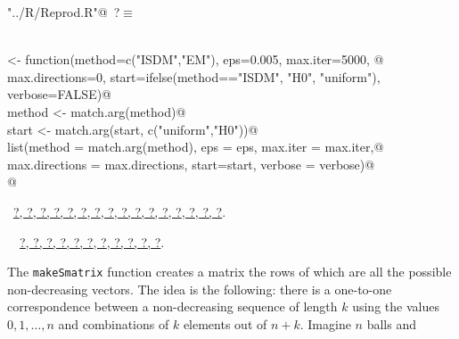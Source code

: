 \documentclass[reqno]{amsart}
\renewcommand{\NWtarget}[2]{\hypertarget{#1}{#2}}
\renewcommand{\NWlink}[2]{\hyperlink{#1}{#2}}
\begin{document}
\begin{flushleft} \small\label{scrap11}\raggedright\small
\NWtarget{nuweb?}{} \verb@"../R/Reprod.R"@\nobreak\ {\footnotesize {?}}$\equiv$
\vspace{-1ex}
\begin{list}{}{} \item
\mbox{}\verb@@\\
\mbox{}\verb@soControl <- function(method=c("ISDM","EM"), eps=0.005, max.iter=5000, @\\
\mbox{}\verb@      max.directions=0, start=ifelse(method=="ISDM", "H0", "uniform"), verbose=FALSE){@\\
\mbox{}\verb@  method <- match.arg(method)@\\
\mbox{}\verb@  start <- match.arg(start, c("uniform","H0"))@\\
\mbox{}\verb@  list(method = match.arg(method), eps = eps, max.iter = max.iter,@\\
\mbox{}\verb@       max.directions = max.directions, start=start, verbose = verbose)@\\
\mbox{}\verb@}@\\
\mbox{}\verb@@{\NWsep}
\end{list}
\vspace{-1.5ex}
\footnotesize
\begin{list}{}{\setlength{\itemsep}{-\parsep}\setlength{\itemindent}{-\leftmargin}}
\item \NWtxtFileDefBy\ \NWlink{nuweb?}{?}\NWlink{nuweb?}{, ?}\NWlink{nuweb?}{, ?}\NWlink{nuweb?}{, ?}\NWlink{nuweb?}{, ?}\NWlink{nuweb?}{, ?}\NWlink{nuweb?}{, ?}\NWlink{nuweb?}{, ?}\NWlink{nuweb?}{, ?}\NWlink{nuweb?}{, ?}\NWlink{nuweb?}{, ?}\NWlink{nuweb?}{, ?}\NWlink{nuweb?}{, ?}\NWlink{nuweb?}{, ?}\NWlink{nuweb?}{, ?}\NWlink{nuweb?}{, ?}.
\item \NWtxtIdentsDefed\nobreak\  \verb@soControl@\nobreak\ \NWlink{nuweb?}{?}\NWlink{nuweb?}{, ?}\NWlink{nuweb?}{, ?}\NWlink{nuweb?}{, ?}\NWlink{nuweb?}{, ?}\NWlink{nuweb?}{, ?}\NWlink{nuweb?}{, ?}\NWlink{nuweb?}{, ?}\NWlink{nuweb?}{, ?}\NWlink{nuweb?}{, ?}\NWlink{nuweb?}{, ?}.
\item{}
\end{list}
\vspace{4ex}
\end{flushleft}
The \texttt{makeSmatrix} function creates a matrix the rows of which are all the
possible non-decreasing vectors. The idea is the following: there is a one-to-one
correspondence between a non-decreasing sequence of length $k$ using the values
$0,1,\dots, n$ and combinations of $k$ elements out of $n+k$. Imagine $n$ balls and
\end{document}
